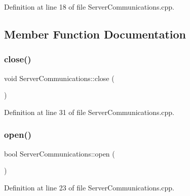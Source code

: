 Definition at line 18 of file Server\+Communications.\+cpp.



\subsection{Member Function Documentation}
\hypertarget{classocra__recipes_1_1ServerCommunications_a412d7330d0fcb83a51a105d4a261e5db}{}\label{classocra__recipes_1_1ServerCommunications_a412d7330d0fcb83a51a105d4a261e5db} 
\subsubsection{\texorpdfstring{close()}{close()}}
{\footnotesize\ttfamily void Server\+Communications\+::close (\begin{DoxyParamCaption}{ }\end{DoxyParamCaption})}



Definition at line 31 of file Server\+Communications.\+cpp.

\hypertarget{classocra__recipes_1_1ServerCommunications_afef1a369ff040f5c774cd5d9533a817f}{}\label{classocra__recipes_1_1ServerCommunications_afef1a369ff040f5c774cd5d9533a817f} 
\subsubsection{\texorpdfstring{open()}{open()}}
{\footnotesize\ttfamily bool Server\+Communications\+::open (\begin{DoxyParamCaption}{ }\end{DoxyParamCaption})}



Definition at line 23 of file Server\+Communications.\+cpp.

\hypertarget{classocra__recipes_1_1ServerCommunications_a66c219902af82f3edb98652c31093c45}{}\label{classocra__recipes_1_1ServerCommunications_a66c219902af82f3edb98652c31093c45} 
